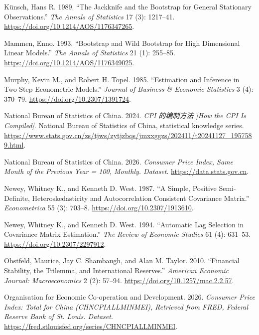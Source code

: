 \documentclass[
  12pt,
  a4paper,
]{article}
\newlength{\cslhangindent}
\newenvironment{CSLReferences}[2] %
 {\begin{list}{}{%
  \setlength{\itemindent}{0pt}
  \setlength{\leftmargin}{0pt}
  \setlength{\parsep}{0pt}
  \ifodd #1
   \setlength{\leftmargin}{\cslhangindent}
   \setlength{\itemindent}{-1\cslhangindent}
  \fi
  \setlength{\itemsep}{#2\baselineskip}}}
 {\end{list}}
\begin{document}
\begin{CSLReferences}{1}{1}
Künsch, Hans R. 1989. {``The Jackknife and the Bootstrap for General
Stationary Observations.''} \emph{The Annals of Statistics} 17 (3):
1217--41. \url{https://doi.org/10.1214/AOS/1176347265}.

Mammen, Enno. 1993. {``Bootstrap and Wild Bootstrap for High Dimensional
Linear Models.''} \emph{The Annals of Statistics} 21 (1): 255--85.
\url{https://doi.org/10.1214/AOS/1176349025}.

Murphy, Kevin M., and Robert H. Topel. 1985. {``Estimation and Inference
in Two-Step Econometric Models.''} \emph{Journal of Business \& Economic
Statistics} 3 (4): 370--79. \url{https://doi.org/10.2307/1391724}.

National Bureau of Statistics of China. 2024. \emph{{CPI} 的编制方法
{[}How the {CPI} Is Compiled{]}}. National Bureau of Statistics of
China, statistical knowledge series.
\url{https://www.stats.gov.cn/zs/tjws/zytjzbqs/jmxxggzs/202411/t20241127_1957589.html}.

National Bureau of Statistics of China. 2026. \emph{Consumer Price
Index, Same Month of the Previous Year = 100, Monthly. Dataset}.
\url{https://data.stats.gov.cn}.

Newey, Whitney K., and Kenneth D. West. 1987. {``A Simple, Positive
Semi-Definite, Heteroskedasticity and Autocorrelation Consistent
Covariance Matrix.''} \emph{Econometrica} 55 (3): 703--8.
\url{https://doi.org/10.2307/1913610}.

Newey, Whitney K., and Kenneth D. West. 1994. {``Automatic Lag Selection
in Covariance Matrix Estimation.''} \emph{The Review of Economic
Studies} 61 (4): 631--53. \url{https://doi.org/10.2307/2297912}.

Obstfeld, Maurice, Jay C. Shambaugh, and Alan M. Taylor. 2010.
{``Financial Stability, the Trilemma, and International Reserves.''}
\emph{American Economic Journal: Macroeconomics} 2 (2): 57--94.
\url{https://doi.org/10.1257/mac.2.2.57}.

Organisation for Economic Co-operation and Development. 2026.
\emph{Consumer Price Index: Total for China (CHNCPIALLMINMEI), Retrieved
from FRED, Federal Reserve Bank of St. Louis. Dataset}.
\url{https://fred.stlouisfed.org/series/CHNCPIALLMINMEI}.


\end{CSLReferences}
\end{document}
